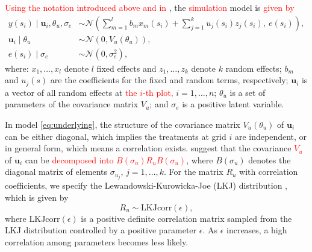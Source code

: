 \documentclass[a4paper]{article} 	%
\newcommand{\N}{\mathcal{N}}
\newcommand{\revision}[1]{\textcolor{red}{#1}}
\begin{document}

	
\revision{Using the notation introduced above and in \textcite{Cao2022Bayesian}}, the \revision{simulation} model is \revision{given by} 
\begin{equation}\label{eq:underlying}
	\begin{split}
		y(s_i)\mid \bm{u}_i,\theta_u,\sigma_e &\sim \N\left( \sum_{m=1}^{l}b_m x_m(s_i) + \sum_{j=1}^{k}u_j(s_i)z_j(s_i),~e(s_i)\right), \\
		\bm{u}_i \mid \theta_u &\sim \N(0,V_u(\theta_u)), \\
		e(s_i) \mid \sigma_e &\sim \N(0,\sigma_e^2), 
	\end{split}
\end{equation}
where: $x_1,\ldots, x_l$ denote $l$ fixed effects and $z_1,\ldots, z_k$ denote $k$ random effects; $b_m$ and $u_j(s)$ are the coefficients for the fixed and random terms, respectively; $\bm{u}_i$ is a vector of all random effects at \revision{the $i$-th plot,} %
$i=1,\ldots,n$; $\theta_u$ is a set of parameters of the covariance matrix $V_u$; and $\sigma_e$ is a positive latent variable. 
	

In model \eqref{eq:underlying}, the structure of the covariance matrix $V_u(\theta_u)$ of $\bm{u}_i$ can be either diagonal, which implies the treatments at grid $i$ are independent, or in general form, which means a correlation exists. \textcite{McElreath2015Statistical} suggest that the covariance \revision{$V_u$} of $\bm{u}_i$ can be \revision{decomposed into $B(\sigma_u)R_uB(\sigma_u)$}, where $B(\sigma_u)$ denotes the diagonal matrix of elements $\sigma_{u_j}$, $j=1,\ldots,k$. For the matrix $R_u$ with correlation coefficients, we specify the Lewandowski-Kurowicka-Joe (LKJ) distribution \parencite{Lewandowski2009Generating}, which is given by
\begin{equation}\label{eq:RPrior}
    R_u \sim \text{LKJcorr}(\epsilon),
\end{equation}
where $\text{LKJcorr}(\epsilon)$ is a positive definite correlation matrix sampled from the LKJ distribution controlled by a positive parameter $\epsilon$. As $\epsilon$ increases, a high correlation among parameters becomes less likely. 
\end{document}
